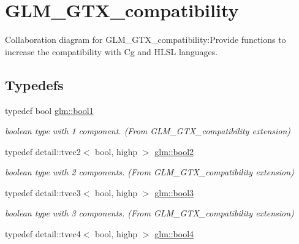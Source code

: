 \hypertarget{group__gtx__compatibility}{
\section{GLM\_\-GTX\_\-compatibility}
\label{group__gtx__compatibility}
}


Collaboration diagram for GLM\_\-GTX\_\-compatibility:Provide functions to increase the compatibility with Cg and HLSL languages.  
\subsection*{Typedefs}
\begin{CompactItemize}
\item 
\hypertarget{group__gtx__compatibility_gb65f19f5170f95a2f06d6aa6482c9405}{
typedef bool \hyperlink{group__gtx__compatibility_gb65f19f5170f95a2f06d6aa6482c9405}{glm::bool1}}
\label{group__gtx__compatibility_gb65f19f5170f95a2f06d6aa6482c9405}

\begin{CompactList}\small\item\em boolean type with 1 component. (From GLM\_\-GTX\_\-compatibility extension) \item\end{CompactList}\item 
\hypertarget{group__gtx__compatibility_gfede6e8549e9bb9da63f404022298d40}{
typedef detail::tvec2$<$ bool, highp $>$ \hyperlink{group__gtx__compatibility_gfede6e8549e9bb9da63f404022298d40}{glm::bool2}}
\label{group__gtx__compatibility_gfede6e8549e9bb9da63f404022298d40}

\begin{CompactList}\small\item\em boolean type with 2 components. (From GLM\_\-GTX\_\-compatibility extension) \item\end{CompactList}\item 
\hypertarget{group__gtx__compatibility_gd18ebb149851844fd704e138c4af9a44}{
typedef detail::tvec3$<$ bool, highp $>$ \hyperlink{group__gtx__compatibility_gd18ebb149851844fd704e138c4af9a44}{glm::bool3}}
\label{group__gtx__compatibility_gd18ebb149851844fd704e138c4af9a44}

\begin{CompactList}\small\item\em boolean type with 3 components. (From GLM\_\-GTX\_\-compatibility extension) \item\end{CompactList}\item 
\hypertarget{group__gtx__compatibility_g6ef1f104d22f384c4d59f2b1ca1768a7}{
typedef detail::tvec4$<$ bool, highp $>$ \hyperlink{group__gtx__compatibility_g6ef1f104d22f384c4d59f2b1ca1768a7}{glm::bool4}}
\label{group__gtx__compatibility_g6ef1f104d22f384c4d59f2b1ca1768a7}


\end{CompactItemize}

